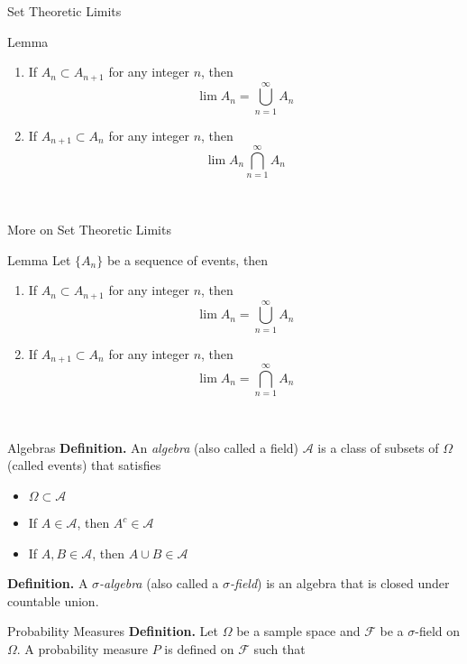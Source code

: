 \documentclass{article}
\begin{document}
\begin{multicols*}{3}
\begin{blackbox}{Set Theoretic Limits}
\begin{brownbox}{Lemma}
\begin{enumerate}
            \item If $A_n \subset A_{n+1}$ for any integer $n$, then 
            \[\lim A_n = \bigcup_{n=1}^\infty A_n\]
            \item If $A_{n+1} \subset A_n$ for any integer $n$, then 
            \[\lim A_n \bigcap_{n=1}^\infty A_n\]
        \end{enumerate}
    \end{brownbox}\\[-2ex]
\end{blackbox}
\begin{blackbox}{More on Set Theoretic Limits}
    \begin{redbox}{Lemma}
        Let $\{A_n\}$ be a sequence of events, then 
        \begin{enumerate}
            \item If $A_n \subset A_{n+1}$ for any integer $n$, then \\[-2ex]
            \[\lim A_n = \bigcup_{n=1}^\infty A_n\]
            \item If $A_{n+1} \subset A_n$ for any integer $n$, then \\[-2ex]
            \[\lim A_n = \bigcap_{n=1}^\infty A_n\]  
        \end{enumerate}
    \end{redbox}\\[-2ex]
\end{blackbox}
\begin{blackbox}{Algebras}
    \textbf{Definition.} An \emph{algebra} (also called a field) $\mathcal{A}$ is a class of subsets of $\Omega$ (called events) that satisfies
    \begin{itemize}
        \item $\Omega \subset \mathcal{A}$ 
        \item If $A \in \mathcal{A}$, then $A^c \in \mathcal{A}$
        \item If $A,B \in \mathcal{A}$, then $A \cup B \in \mathcal{A}$
    \end{itemize}
    \textbf{Definition.} A \emph{$\sigma$-algebra} (also called a \emph{$\sigma$-field}) is an algebra that is closed under countable union.  
\end{blackbox}
\begin{blackbox}{Probability Measures}
    \textbf{Definition.} Let $\Omega$ be a sample space and $\mathcal{F}$ be a $\sigma$-field on $\Omega$. A probability measure $P$ is defined on $\mathcal{F}$ such that 
    \begin{enumerate}[label=(\roman*)]

\end{enumerate}
\end{blackbox}
\end{multicols*}
\end{document}
